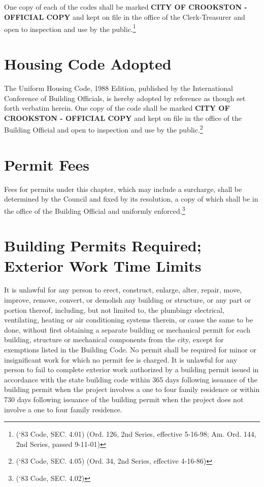 \subsection{}
One copy of each of the codes shall be marked \textbf{CITY OF CROOKSTON - OFFICIAL COPY} and kept on file in the office of the Clerk-Treasurer and open to inspection and use by the public.\footnote{(‘83 Code, SEC. 4.01)  (Ord. 126, 2nd Series, effective 5-16-98; Am. Ord. 144, 2nd Series, passed 9-11-01)}

\section{Housing Code Adopted}
The Uniform Housing Code, 1988 Edition, published by the International Conference of Building Officials, is hereby adopted by reference as though set forth verbatim herein.  One copy of the code shall be marked \textbf{CITY OF CROOKSTON - OFFICIAL COPY} and kept on file in the office of the Building Official and open to inspection and use by the public.\footnote{(‘83 Code, SEC. 4.05)  (Ord. 34, 2nd Series, effective 4-16-86)}

\section{Permit Fees}
Fees for permits under this chapter, which may include a surcharge, shall be determined by the Council and fixed by its resolution, a copy of which shall be in the office of the Building Official and uniformly enforced.\footnote{(‘83 Code, SEC. 4.02)}

\section{Building Permits Required; Exterior Work Time Limits}
It is unlawful for any person to erect, construct, enlarge, alter, repair, move, improve, remove, convert, or demolish any building or structure, or any part or portion thereof, including, but not limited to, the plumbingr electrical, ventilating, heating or air conditioning systems therein, or cause the same to be done, without first obtaining a separate building or mechanical permit for each building, structure or mechanical components from the city, except for exemptions listed in the Building Code. No permit shall be required for minor or insignificant work for which no permit fee is charged. It is unlawful for any person to fail to complete exterior work authorized by a building permit issued in accordance with the state building code within 365 days following issuance of the building permit when the project involves a one to four family residence or within 730 days following issuance of the building permit when the project does not involve a one to four family residence.

